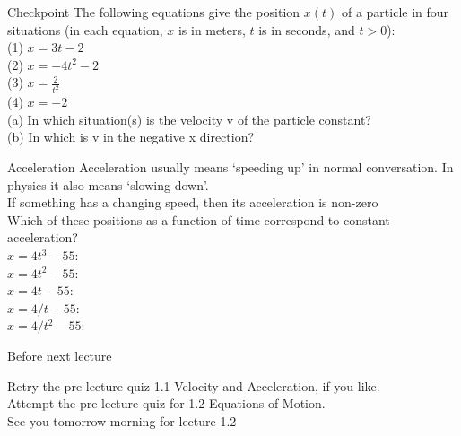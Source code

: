  
  \begin{frame}{Checkpoint }
  \small
The following equations give the position $x(t)$ of a particle in four situations (in each equation, $x$ is in meters, $t$ is in seconds, and $t > 0$):\\[2ex]

 (1) $x = 3t - 2$\\[1ex]
 (2) $x = -4t^2 - 2$\\[1ex]
 (3) $x = \frac{2}{t^2}$\\[1ex]
 (4) $x = -2$ \\[3ex]
 
 (a) In which situation(s) is the velocity v of the particle constant? \\[2ex]
 (b) In which is v in the negative x direction?\\
\vspace{2cm}
 
 
 \end{frame}
 
\begin{frame}{Acceleration}
\small
Acceleration usually means `speeding up' in normal conversation. In physics it also means `slowing down'.\\[1ex]

If something has a changing speed, then its acceleration is non-zero\\[1ex]

Which of these positions as a function of time correspond to constant acceleration?\\[1ex]
$x = 4t^3 - 55$:\\[1ex]
$x = 4t^2 - 55$:\\[1ex]
$x = 4t - 55$:\\[1ex]
$x = 4/t - 55$:\\[1ex]
$x = 4/t^2 - 55$:\\[1ex]
\end{frame}


\begin{frame}{Before next lecture}

Retry the pre-lecture quiz 1.1  Velocity and Acceleration, if you like.\\[2ex]
Attempt the pre-lecture quiz for 1.2  Equations of Motion.\\[2ex]
See you tomorrow morning for lecture 1.2\\

\end{frame}

